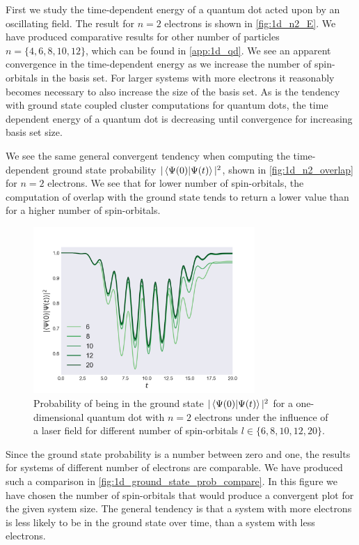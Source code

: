 First we study the time-dependent energy of a quantum dot acted upon by an oscillating 
field. The result for $n=2$ electrons is shown in \autoref{fig:1d_n2_E}. We have 
produced comparative results for other number of particles $n=\{4,6,8,10,12\}$,
which can be found in \autoref{app:1d_qd}. We see an apparent convergence in the 
time-dependent energy as we increase the number of spin-orbitals in the basis set.
For larger systems with more electrons it reasonably becomes necessary to also increase
the size of the basis set. As is the tendency with ground state coupled cluster computations
for quantum dots\cite{jorgensen2011many,lohne2010coupled}, the time dependent energy 
of a quantum dot is decreasing until convergence for increasing basis set size.

We see the same general convergent tendency when computing the time-dependent ground 
state probability $|\braket{\Psi(0)}{\Psi(t)}|^2$, shown in \autoref{fig:1d_n2_overlap} for $n=2$ electrons. We see that 
for lower number of spin-orbitals, the computation of overlap with 
the ground state tends to return a lower value than for a higher number of spin-orbitals.

\begin{figure}
    \centering
    \includegraphics[width=0.75\textwidth]{results/figures/1D/n=2overlap.png} 
    \caption{Probability of being in the ground state $|\braket*{\Psi(0)}{\Psi(t)}|^2$
        for a one-dimensional quantum dot with $n=2$ electrons under 
        the influence of a laser field for different number of spin-orbitals 
        $l\in\{6,8,10,12,20\}$.
    }
    \label{fig:1d_n2_overlap}
\end{figure}

Since the ground state probability is a number between zero and one, the results for systems 
of different number of electrons are comparable. We have produced such a comparison in 
\autoref{fig:1d_ground_state_prob_compare}. In this figure we have chosen the number of
spin-orbitals that would produce a convergent plot for the given system size. The general 
tendency is that a system with more electrons is less likely to be in the ground state 
over time, than a system with less electrons.

